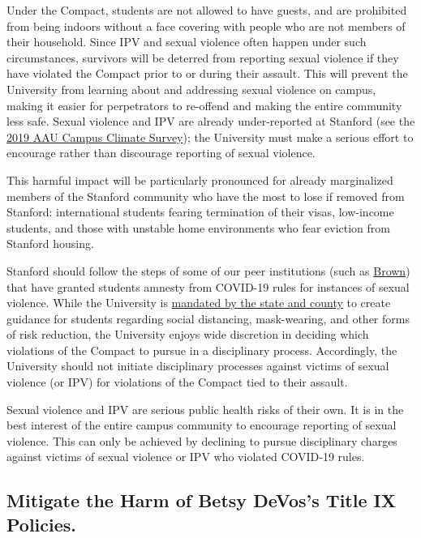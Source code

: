 \documentclass[12pt, titlepage, letterpaper]{article}
\begin{document}
Under the Compact, students are not allowed to have guests, and are prohibited from being indoors without a face covering with people who are not members of their household. Since IPV and sexual violence often happen under such circumstances, survivors will be deterred from reporting sexual violence if they have violated the Compact prior to or during their assault. This will prevent the University from learning about and addressing sexual violence on campus, making it easier for perpetrators to re-offend and making the entire community less safe. Sexual violence and IPV are already under-reported at Stanford (see the \href{https://provost.stanford.edu/wp-content/uploads/sites/4/2019/10/AAU-2019-Survey-Stanford-University-Report-and-Appendices.pdf}{2019 AAU Campus Climate Survey}); the University must make a serious effort to encourage rather than discourage reporting of sexual violence.

This harmful impact will be particularly pronounced for already marginalized members of the Stanford community who have the most to lose if removed from Stanford: international students fearing termination of their visas, low-income students, and those with unstable home environments who fear eviction from Stanford housing.

Stanford should follow the steps of some of our peer institutions (such as \href{https://www.brown.edu/about/administration/title-ix/Title\%20IX\%20grievance\%20Procedure}{Brown}) that have granted students amnesty from COVID-19 rules for instances of sexual violence. While the University is \href{https://files.covid19.ca.gov/pdf/guidance-higher-education--en.pdf}{mandated by the state and county} to create guidance for students regarding social distancing, mask-wearing, and other forms of risk reduction, the University enjoys wide discretion in deciding which violations of the Compact to pursue in a disciplinary process. Accordingly, the University should not initiate disciplinary processes against victims of sexual violence (or IPV) for violations of the Compact tied to their assault. 

Sexual violence and IPV are serious public health risks of their own. It is in the best interest of the entire campus community to encourage reporting of sexual violence. This can only be achieved by declining to pursue disciplinary charges against victims of sexual violence or IPV who violated COVID-19 rules.

\subsection*{Mitigate the Harm of Betsy DeVos’s Title IX Policies.}
%
\end{document}
